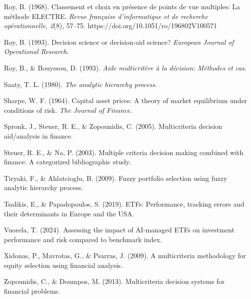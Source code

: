\documentclass[12pt,letterpaper]{article}
\newcommand{\apa}[1]{\begingroup\sloppy\hangindent=1.25cm\hangafter=1 #1\par\vspace{0.35em}\endgroup}
\begin{document}
\apa{Roy, B. (1968). Classement et choix en présence de points de vue multiples: La méthode ELECTRE. \textit{Revue française d'informatique et de recherche opérationnelle, 2}(8), 57--75. https://doi.org/10.1051/ro/196802V100571}

\apa{Roy, B. (1993). Decision science or decision-aid science? \textit{European Journal of Operational Research}.}

\apa{Roy, B., \& Bouyssou, D. (1993). \textit{Aide multicritère à la décision: Méthodes et cas}.}

\apa{Saaty, T. L. (1980). \textit{The analytic hierarchy process}.}

\apa{Sharpe, W. F. (1964). Capital asset prices: A theory of market equilibrium under conditions of risk. \textit{The Journal of Finance}.}

\apa{Spronk, J., Steuer, R. E., \& Zopounidis, C. (2005). Multicriteria decision aid/analysis in finance.}

\apa{Steuer, R. E., \& Na, P. (2003). Multiple criteria decision making combined with finance: A categorized bibliographic study.}

\apa{Tiryaki, F., \& Ahlatcioglu, B. (2009). Fuzzy portfolio selection using fuzzy analytic hierarchy process.}

\apa{Tsalikis, E., \& Papadopoulos, S. (2019). ETFs: Performance, tracking errors and their determinants in Europe and the USA.}

\apa{Vuorela, T. (2024). Assessing the impact of AI-managed ETFs on investment performance and risk compared to benchmark index.}

\apa{Xidonas, P., Mavrotas, G., \& Psarras, J. (2009). A multicriteria methodology for equity selection using financial analysis.}

\apa{Zopounidis, C., \& Doumpos, M. (2013). Multicriteria decision systems for financial problems.}
\end{document}
